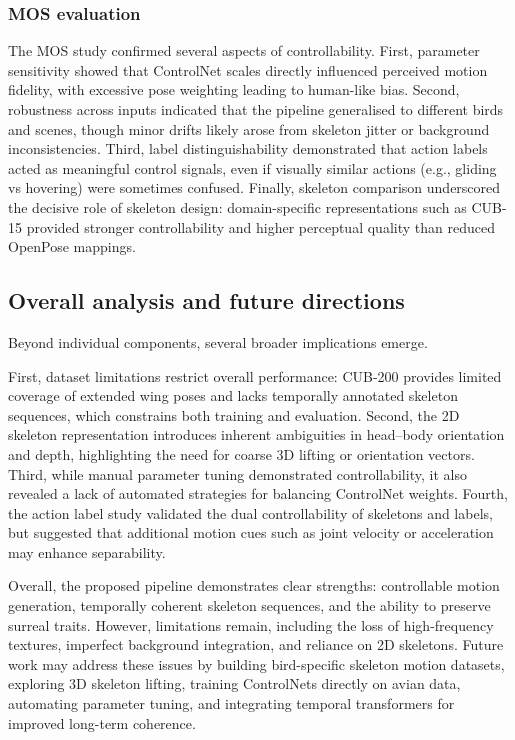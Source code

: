 \documentclass[final-report]{report-template}
\begin{document}
\subsubsection{MOS evaluation}
The MOS study confirmed several aspects of controllability.  
First, parameter sensitivity showed that ControlNet scales directly influenced perceived motion fidelity, with excessive pose weighting leading to human-like bias.  
Second, robustness across inputs indicated that the pipeline generalised to different birds and scenes, though minor drifts likely arose from skeleton jitter or background inconsistencies.  
Third, label distinguishability demonstrated that action labels acted as meaningful control signals, even if visually similar actions (e.g., gliding vs hovering) were sometimes confused.  
Finally, skeleton comparison underscored the decisive role of skeleton design: domain-specific representations such as CUB-15 provided stronger controllability and higher perceptual quality than reduced OpenPose mappings.


\subsection{Overall analysis and future directions}
Beyond individual components, several broader implications emerge. 

First, dataset limitations restrict overall performance: CUB-200 provides limited coverage of extended wing poses and lacks temporally annotated skeleton sequences, which constrains both training and evaluation.  
Second, the 2D skeleton representation introduces inherent ambiguities in head–body orientation and depth, highlighting the need for coarse 3D lifting or orientation vectors.  
Third, while manual parameter tuning demonstrated controllability, it also revealed a lack of automated strategies for balancing ControlNet weights.  
Fourth, the action label study validated the dual controllability of skeletons and labels, but suggested that additional motion cues such as joint velocity or acceleration may enhance separability.  

Overall, the proposed pipeline demonstrates clear strengths: controllable motion generation, temporally coherent skeleton sequences, and the ability to preserve surreal traits. 
However, limitations remain, including the loss of high-frequency textures, imperfect background integration, and reliance on 2D skeletons.  
Future work may address these issues by building bird-specific skeleton motion datasets, exploring 3D skeleton lifting, training ControlNets directly on avian data, automating parameter tuning, and integrating temporal transformers for improved long-term coherence.
\end{document}
